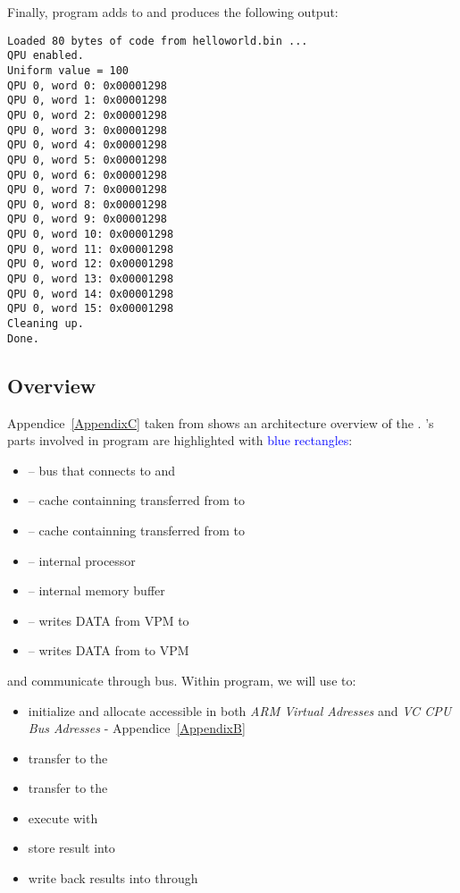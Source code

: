 Finally, program adds  to  and produces the following output:

\begin{lstlisting}
Loaded 80 bytes of code from helloworld.bin ...
QPU enabled.
Uniform value = 100
QPU 0, word 0: 0x00001298
QPU 0, word 1: 0x00001298
QPU 0, word 2: 0x00001298
QPU 0, word 3: 0x00001298
QPU 0, word 4: 0x00001298
QPU 0, word 5: 0x00001298
QPU 0, word 6: 0x00001298
QPU 0, word 7: 0x00001298
QPU 0, word 8: 0x00001298
QPU 0, word 9: 0x00001298
QPU 0, word 10: 0x00001298
QPU 0, word 11: 0x00001298
QPU 0, word 12: 0x00001298
QPU 0, word 13: 0x00001298
QPU 0, word 14: 0x00001298
QPU 0, word 15: 0x00001298
Cleaning up.
Done.
\end{lstlisting}


\subsection{\vc{} Overview}



Appendice~\ref{AppendixC} taken from \parencite{refVC} shows an architecture overview of the \vc. 's parts involved in  program are highlighted with \textcolor{blue}{blue rectangles}:


\begin{itemize}
	\item {} -- bus that connects \vc{} to \ram{} and \cpu
	\item {} -- cache containning  transferred from \cpu{} to \vc
	\item {} -- cache containning  transferred from \cpu{} to \vc
	\item {} -- \vc{} internal processor
	\item {} -- \vc{} internal memory buffer
	\item {} -- writes DATA from VPM to \ram{}
	\item {} -- writes DATA from \ram{} to VPM
\end{itemize}
\vspace{5 mm}

\cpu{} and \vc{} communicate through  bus. Within  program, we will use \cpu{} to:
\begin{itemize}
	\item initialize and allocate \ram{} accessible in both \emph{ARM Virtual Adresses} and \emph{VC CPU Bus Adresses} - Appendice~\ref{AppendixB}
	\item transfer  to the 
	\item transfer  to the 
	\item execute  with 
	\item store result into 
	\item write back results into \ram{} through 
\end{itemize}


